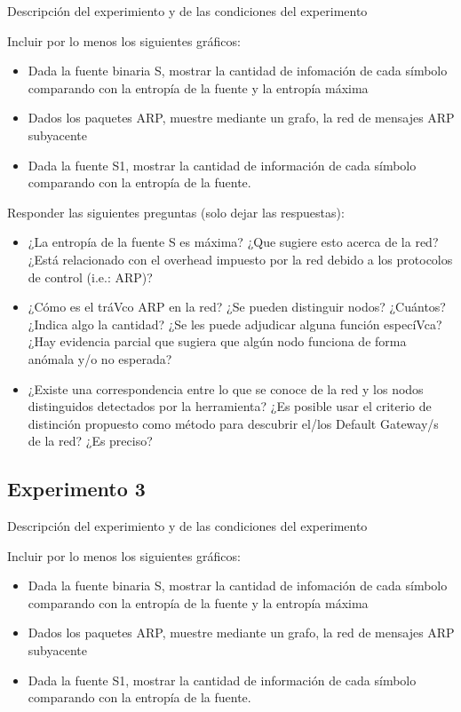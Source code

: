 Descripci\'on del experimiento y de las condiciones del experimento

Incluir por lo menos los siguientes gr\'aficos:

\begin{itemize}
	\item Dada la fuente binaria S, mostrar la cantidad de infomación de cada símbolo comparando con la entropía de la fuente y la entropía máxima
	\item Dados los paquetes ARP, muestre mediante un grafo, la red de mensajes ARP subyacente
	\item Dada la fuente S1, mostrar la cantidad de información de cada símbolo comparando con la entropía de la fuente.
\end{itemize}

Responder las siguientes preguntas (solo dejar las respuestas):

\begin{itemize}
	\item ¿La entropía de la fuente S es máxima? ¿Que sugiere esto acerca de la red? ¿Está relacionado con el overhead impuesto por la red debido a los protocolos de control (i.e.: ARP)?
	\item ¿Cómo es el tráVco ARP en la red? ¿Se pueden distinguir nodos? ¿Cuántos? ¿Indica algo la cantidad? ¿Se les puede adjudicar alguna función especíVca? ¿Hay evidencia parcial que sugiera que algún nodo funciona de forma anómala y/o no esperada?
	\item ¿Existe una correspondencia entre lo que se conoce de la red y los nodos distinguidos detectados por la herramienta? ¿Es posible usar el criterio de distinción propuesto como método para descubrir el/los Default Gateway/s de la red? ¿Es preciso?
\end{itemize}


\subsection{Experimento 3}

Descripci\'on del experimiento y de las condiciones del experimento

Incluir por lo menos los siguientes gr\'aficos:

\begin{itemize}
	\item Dada la fuente binaria S, mostrar la cantidad de infomación de cada símbolo comparando con la entropía de la fuente y la entropía máxima
	\item Dados los paquetes ARP, muestre mediante un grafo, la red de mensajes ARP subyacente
	\item Dada la fuente S1, mostrar la cantidad de información de cada símbolo comparando con la entropía de la fuente.
\end{itemize}


